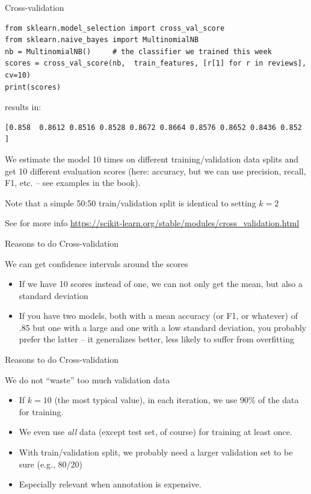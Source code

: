 \documentclass[compress]{beamer}
\begin{document}
\begin{frame}[fragile]{Cross-validation}
\begin{lstlisting}
from sklearn.model_selection import cross_val_score
from sklearn.naive_bayes import MultinomialNB
nb = MultinomialNB()     # the classifier we trained this week
scores = cross_val_score(nb,  train_features, [r[1] for r in reviews], cv=10)
print(scores)
\end{lstlisting}

results in:

\begin{lstlisting}
[0.858  0.8612 0.8516 0.8528 0.8672 0.8664 0.8576 0.8652 0.8436 0.852 ]
\end{lstlisting}

We estimate the model 10 times on different training/validation data splits and get 10 different evaluation scores (here: accuracy, but we can use precision, recall, F1, etc. -- see examples in the book).

Note that a simple 50:50 train/validation split is identical to setting $k=2$ 

{\tiny See for more info
	\url{https://scikit-learn.org/stable/modules/cross\_validation.html}}
\end{frame}



\begin{frame}{Reasons to do Cross-validation}
	\begin{block}{We can get confidence intervals around the scores}
		\begin{itemize}
			\item If we have 10 scores instead of one, we can not only get the mean, but also a standard deviation
			\item If you have two models, both with a mean accuracy (or F1, or whatever) of .85 but one with a large and one with a low standard deviation, you probably prefer the latter -- it generalizes better, less likely to suffer from overfitting
		\end{itemize}	
	\end{block}

\end{frame}






\begin{frame}{Reasons to do Cross-validation}
	\begin{block}{We do not ``waste'' too much validation data}
		\begin{itemize}
			\item If $k=10$ (the most typical value), in each iteration, we use 90\% of the data for training.
			\item We even use \emph{all} data (except test set, of course) for training at least once.
			\item With train/validation split, we probably need a larger validation set to be sure (e.g., 80/20)
			\item Especially relevant when annotation is expensive.
		\end{itemize}
	\end{block}
\end{frame}
\end{document}
